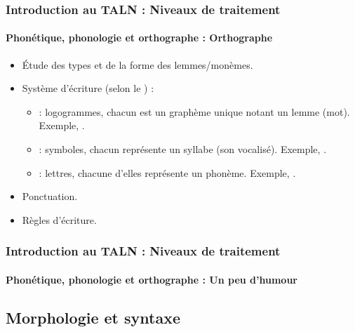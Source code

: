 \documentclass[xcolor=table]{beamer}
\begin{document}
\begin{frame}
\frametitle{Introduction au TALN : Niveaux de traitement}
\framesubtitle{Phonétique, phonologie et orthographe : Orthographe}

\begin{itemize}
	\item Étude des types et de la forme des lemmes/monèmes.
	\item Système d'écriture (selon le ) : 
	\begin{itemize}
		\item {} : logogrammes, chacun est un graphème unique notant un lemme (mot).
		Exemple, .
		\item {} : symboles, chacun représente un syllabe (son vocalisé). 
		Exemple, .
		\item {} : lettres, chacune d'elles représente un phonème. 
		Exemple, .
	\end{itemize}
	\item Ponctuation.
	\item Règles d'écriture.
\end{itemize}

\end{frame}

\begin{frame}
\frametitle{Introduction au TALN : Niveaux de traitement}
\framesubtitle{Phonétique, phonologie et orthographe : Un peu d'humour}

\begin{center}
\end{center}

\end{frame}

\subsection{Morphologie et syntaxe}
\end{document}
